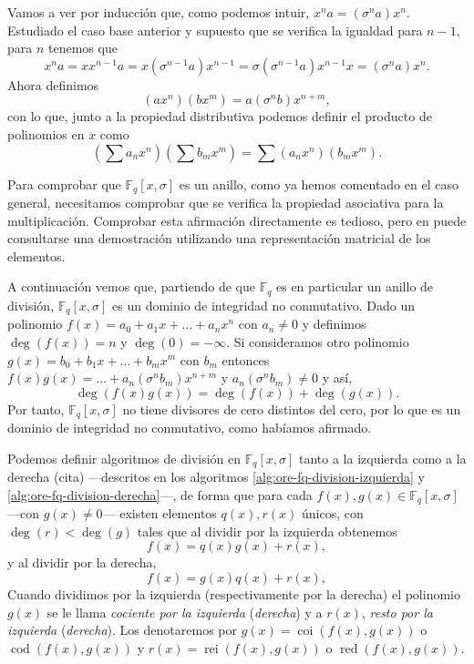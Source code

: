 Vamos a ver por inducción que, como podemos intuir, \(x^n a = (\sigma^n a)x^n\). 
Estudiado el caso base anterior y supuesto que se verifica la igualdad para \(n - 1\), para \(n\) tenemos que
\[
  x^{n}a = xx^{n - 1}a = x(\sigma^{n-1} a)x^{n-1} = \sigma(\sigma^{n-1} a)x^{n-1}x = (\sigma^{n}a)x^{n}.
\]
Ahora definimos
\[
  (ax^n)(bx^m) = a(\sigma^n b)x^{n+m},
\]
con lo que, junto a la propiedad distributiva podemos definir el producto de polinomios en \(x\) como
\[
  \textstyle(\sum a_nx^n)(\sum b_mx^m) = \sum(a_nx^n)(b_mx^m).
\]

Para comprobar que \(\mathbb F_q[x, \sigma]\) es un anillo, como ya hemos comentado en el caso general, necesitamos comprobar que se verifica la propiedad asociativa para la multiplicación.
Comprobar esta afirmación directamente es tedioso, pero en \parencite[p. 2-3]{jacobson_finite-dimensional_1996} puede consultarse una demostración utilizando una representación matricial de los elementos.

A continuación vemos que, partiendo de que \(\mathbb F_q\) es en particular un anillo de división, \(\mathbb F_q[x, \sigma]\) es un dominio de integridad no conmutativo.
Dado un polinomio \(f(x) = a_0 + a_1x + \dots + a_nx^n\) con \(a_n \neq 0\) y definimos \(\deg(f(x)) = n\) y \(\deg(0) = -\infty\).
Si consideramos otro polinomio \(g(x) = b_0 + b_1x + \dots + b_mx^m\) con \(b_m\) entonces \(f(x)g(x) = \dots + a_n(\sigma^n b_m)x^{n+m}\) y \(a_n(\sigma^nb_m) \neq 0\) y así,
\[
  \deg(f(x)g(x)) = \deg(f(x)) + \deg(g(x)).
\]
Por tanto, \(\mathbb F_q[x, \sigma]\) no tiene divisores de cero distintos del cero, por lo que es un dominio de integridad no conmutativo, como habíamos afirmado.

Podemos definir algoritmos de división en \(\mathbb F_q[x, \sigma]\) tanto a la izquierda como a la derecha (cita)  —descritos en los algoritmos \ref{alg:ore-fq-division-izquierda} y \ref{alg:ore-fq-division-derecha}—, de forma que para cada \(f(x), g(x) \in \mathbb F_q[x, \sigma]\) —con \(g(x) \neq 0\)— existen elementos \(q(x), r(x)\) únicos, con \(\deg(r) < \deg(g)\) tales que al dividir por la izquierda obtenemos
\[
  f(x) = q(x)g(x) + r(x),
\]
y al dividir por la derecha, 
\[
  f(x) = g(x)q(x) + r(x),
\]
Cuando dividimos por la izquierda (respectivamente por la derecha) el polinomio \(g(x)\) se le llama \textit{cociente por la izquierda} (\textit{derecha}) y a \(r(x)\), \textit{resto por la izquierda} (\textit{derecha}).
Los denotaremos por \(g(x) = \operatorname{coi}(f(x), g(x))\) o \(\operatorname{cod}(f(x), g(x))\) y \(r(x) = \operatorname{rei}(f(x), g(x))\) o \(\operatorname{red}(f(x), g(x))\).

